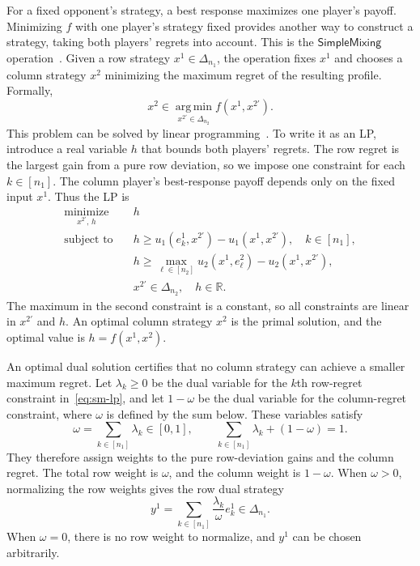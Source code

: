 \documentclass[11pt]{article}
\theoremstyle{remark}
\theoremstyle{plain}
\newcommand{\sm}{\mathsf{SimpleMixing}}
\begin{document}
For a fixed opponent's strategy, a best response maximizes one
player's payoff. Minimizing $f$ with one player's strategy fixed
provides another way to construct a strategy, taking both players'
regrets into account. This is the $\sm$ operation~\cite{automating2025}.
Given a row strategy $x^1\in\Delta_{n_1}$, the operation fixes $x^1$
and chooses a column strategy $x^2$ minimizing the maximum regret
of the resulting profile. Formally,
\begin{equation}
 x^2\in\operatorname*{arg\,min}_{x^{2\prime}\in\Delta_{n_2}}f(x^1,x^{2\prime}).
 \label{eq:sm-definition}
\end{equation}
This problem can be solved by linear programming~\cite{automating2025}.
To write it as an LP, introduce a real variable $h$ that
bounds both players' regrets. The row regret is the largest gain
from a pure row deviation, so we impose one constraint for each
$k\in[n_1]$. The column player's best-response payoff depends only
on the fixed input $x^1$. Thus the LP is
\begin{equation}
 \begin{aligned}
  \operatorname*{minimize}_{x^{2\prime},\,h}\quad &h\\
  \text{subject to}\quad
   &h\ge u_1(e_k^1,x^{2\prime})-u_1(x^1,x^{2\prime}),
      \quad k\in[n_1],\\
   &h\ge\max_{\ell\in[n_2]}u_2(x^1,e_\ell^2)
             -u_2(x^1,x^{2\prime}),\\
   &x^{2\prime}\in\Delta_{n_2},\quad h\in\mathbb R.
 \end{aligned}
 \label{eq:sm-lp}
\end{equation}
The maximum in the second constraint is a constant, so all constraints
are linear in $x^{2\prime}$ and $h$.
An optimal column strategy $x^2$ is the primal solution,
and the optimal value is $h=f(x^1,x^2)$.

An optimal dual solution certifies that no column strategy can achieve
a smaller maximum regret. Let $\lambda_k\ge0$ be the dual variable
for the $k$th row-regret constraint in~\eqref{eq:sm-lp}, and let
$1-\omega$ be the dual variable for the column-regret constraint,
where $\omega$ is defined by the sum below.
These variables satisfy
\[
 \omega=\sum_{k\in[n_1]}\lambda_k\in[0,1],\qquad
 \sum_{k\in[n_1]}\lambda_k+(1-\omega)=1.
\]
They therefore assign weights to the pure row-deviation gains and
the column regret. The total row weight is $\omega$, and the column weight is $1-\omega$.
When $\omega>0$, normalizing the row weights gives the row dual strategy
\[
 y^1=\sum_{k\in[n_1]}\frac{\lambda_k}{\omega}e_k^1
       \in\Delta_{n_1}.
\]
When $\omega=0$, there is no row weight to normalize, and $y^1$ can be
chosen arbitrarily.
\end{document}
